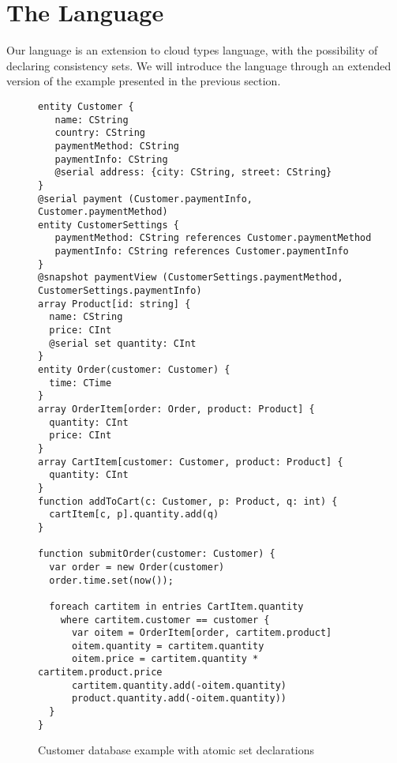 

\section{The  Language} 

Our language is an extension to cloud types language, with the possibility of
declaring consistency sets. We will introduce the language through an extended
version of the example presented in the previous section. 

%
\begin{figure}[tp]
\begin{lstlisting}
entity Customer {
   name: CString 
   country: CString
   paymentMethod: CString
   paymentInfo: CString
   @serial address: {city: CString, street: CString}
}
@serial payment (Customer.paymentInfo, Customer.paymentMethod)
entity CustomerSettings {
   paymentMethod: CString references Customer.paymentMethod
   paymentInfo: CString references Customer.paymentInfo
}
@snapshot paymentView (CustomerSettings.paymentMethod, CustomerSettings.paymentInfo)
array Product[id: string] {
  name: CString
  price: CInt
  @serial set quantity: CInt 
}
entity Order(customer: Customer) {
  time: CTime
}
array OrderItem[order: Order, product: Product] {
  quantity: CInt
  price: CInt
}
array CartItem[customer: Customer, product: Product] {
  quantity: CInt
}
function addToCart(c: Customer, p: Product, q: int) {
  cartItem[c, p].quantity.add(q)
}

function submitOrder(customer: Customer) {
  var order = new Order(customer)
  order.time.set(now());

  foreach cartitem in entries CartItem.quantity 
    where cartitem.customer == customer {
      var oitem = OrderItem[order, cartitem.product]
      oitem.quantity = cartitem.quantity
      oitem.price = cartitem.quantity * cartitem.product.price
      cartitem.quantity.add(-oitem.quantity)
      product.quantity.add(-oitem.quantity))
  }
}
\end{lstlisting}
\caption{Customer database example with atomic set declarations}
\end{figure}
\label{lst:ctStoreSets}
\
%    

